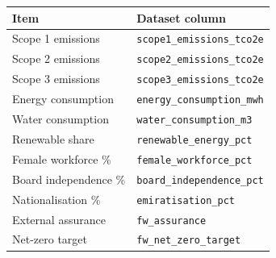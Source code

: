 \begin{tabular}{ll}\toprule Item & Dataset column \\ \midrule
Scope 1 emissions & \texttt{scope1\_emissions\_tco2e} \\
Scope 2 emissions & \texttt{scope2\_emissions\_tco2e} \\
Scope 3 emissions & \texttt{scope3\_emissions\_tco2e} \\
Energy consumption & \texttt{energy\_consumption\_mwh} \\
Water consumption & \texttt{water\_consumption\_m3} \\
Renewable share & \texttt{renewable\_energy\_pct} \\
Female workforce \% & \texttt{female\_workforce\_pct} \\
Board independence \% & \texttt{board\_independence\_pct} \\
Nationalisation \% & \texttt{emiratisation\_pct} \\
External assurance & \texttt{fw\_assurance} \\
Net-zero target & \texttt{fw\_net\_zero\_target} \\
\bottomrule\end{tabular}
